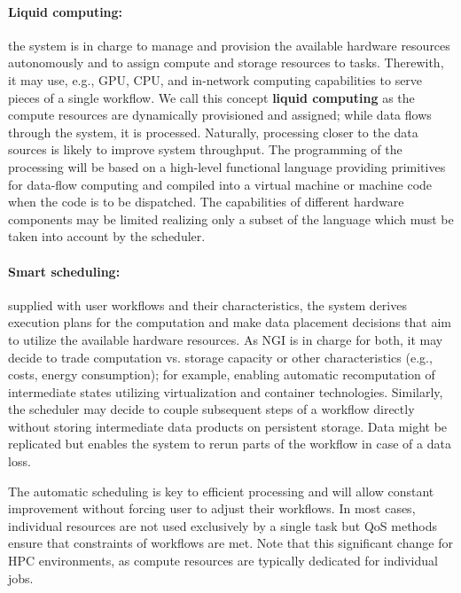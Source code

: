 \documentclass[a4paper, twocolumn]{article}
\begin{document}
\paragraph{Liquid computing:}
the system is in charge to manage and provision the available hardware resources autonomously and to assign compute and storage resources to tasks.
Therewith, it may use, e.g., GPU, CPU, and in-network computing capabilities to serve pieces of a single workflow.
We call this concept \textbf{liquid computing} as the compute resources are dynamically provisioned and assigned; while data flows through the system, it is processed.
Naturally, processing closer to the data sources is likely to improve system throughput.
The programming of the processing will be based on a high-level functional language providing primitives for data-flow computing and compiled into a virtual machine or machine code when the code is to be dispatched.
The capabilities of different hardware components may be limited realizing only a subset of the language which must be taken into account by the scheduler.


\paragraph{Smart scheduling:}
supplied with user workflows and their characteristics, the system derives execution plans for the computation and make data placement decisions that aim to utilize the available hardware resources.
As NGI is in charge for both, it may decide to trade computation vs. storage capacity or other characteristics (e.g., costs, energy consumption); for example, enabling automatic recomputation of intermediate states utilizing virtualization and container technologies.
Similarly, the scheduler may decide to couple subsequent steps of a workflow directly without storing intermediate data products on persistent storage.
Data might be replicated but enables the system to rerun parts of the workflow in case of a data loss.

The automatic scheduling is key to efficient processing and will allow constant improvement without forcing user to adjust their workflows.
In most cases, individual resources are not used exclusively by a single task but QoS methods ensure that constraints of workflows are met.
Note that this significant change for HPC environments, as compute resources are typically dedicated for individual jobs.
\end{document}
